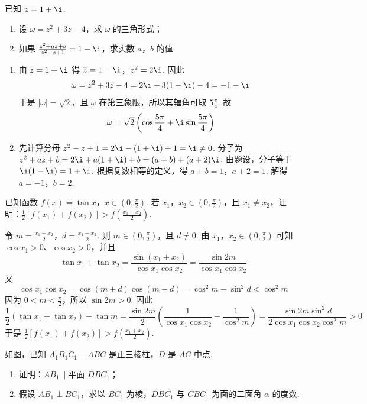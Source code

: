 \documentclass[UTF8,a4paper,oneside,11pt]{ctexbook}
\begin{document}
\begin{problem}
已知 \(z = 1 + \i\).

\begin{enumerate}
\item 设 \(\omega = z^2 + 3\overline{z} - 4\)，求 \(\omega\) 的三角形式；
\item 如果 \(\frac{z^{2}+az+b}{z^{2}-z+1}=1-\i\)，求实数 \(a\)，\(b\) 的值.
\end{enumerate}
\end{problem}

\begin{solution}
\begin{enumerate}
\item 由 \(z=1+\i\) 得 \(\overline{z}=1-\i\)，\(z^2=2\i\). 因此
\[
\omega=z^2+3\overline{z}-4
=2\i+3(1-\i)-4=-1-\i
\]
于是 \(|\omega|=\sqrt{2}\)，且 \(\omega\) 在第三象限，所以其辐角可取 \(5\frac{\pi}{4}\). 故
\[
\omega=\sqrt{2}\left(\cos\frac{5\pi}{4}+\i\sin\frac{5\pi}{4}\right)
\]
\item 先计算分母
\(z^2-z+1=2\i-(1+\i)+1=\i\neq0\).
分子为 \(z^2+az+b=2\i+a(1+\i)+b=(a+b)+(a+2)\i\). 由题设，分子等于 \(\i(1-\i)=1+\i\). 根据复数相等的定义，得 \(a+b=1\)，\(a+2=1\).
解得 \(a=-1\)，\(b=2\).
\end{enumerate}
\end{solution}

\begin{problem}
已知函数 \(f(x) = \tan x\)，\(x \in \left(0, \frac{\pi}{2}\right)\). 若 \(x_1\)，\(x_2 \in \left(0, \frac{\pi}{2}\right)\)，且 \(x_1 \neq x_2 \)，证明：\(\frac{1}{2}\left[f(x_1) + f(x_2)\right] > f\left(\frac{x_1 + x_2}{2}\right) \).
\end{problem}

\begin{solution}
令 \(m=\frac{x_1+x_2}{2}\)，\(d=\frac{x_1-x_2}{2}\).
则 \(m\in(0,\frac{\pi}{2})\)，且 \(d\neq0\). 由 \(x_1\)，\(x_2\in(0,\frac{\pi}{2})\) 可知 \(\cos x_1>0\)、\(\cos x_2>0\)，并且
\[
\tan x_1+\tan x_2
=\frac{\sin(x_1+x_2)}{\cos x_1\cos x_2}
=\frac{\sin 2m}{\cos x_1\cos x_2}
\]
又
\[
\cos x_1\cos x_2
=\cos(m+d)\cos(m-d)
=\cos^2m-\sin^2d<\cos^2m
\]
因为 \(0<m<\frac{\pi}{2}\)，所以 \(\sin2m>0\). 因此
\[
\frac12\left(\tan x_1+\tan x_2\right)-\tan m
=\frac{\sin2m}{2}\left(\frac{1}{\cos x_1\cos x_2}-\frac{1}{\cos^2m}\right)
=\frac{\sin2m\sin^2d}{2\cos x_1\cos x_2\cos^2m}>0
\]
于是 \(\frac12\left[f(x_1)+f(x_2)\right]>f\left(\frac{x_1+x_2}{2}\right)\).
\end{solution}

\begin{problem}
如图，已知 \(A_{1}B_{1}C_{1} - ABC\) 是正三棱柱，\(D\) 是 \(AC\) 中点.

\begin{enumerate}
\item 证明：\(AB_{1} \parallel \text{平面 } DBC_{1}\)；
\item 假设 \(AB_{1} \perp BC_{1}\)，求以 \(BC_{1}\) 为棱，\(DBC_{1}\) 与 \(CBC_{1}\) 为面的二面角 \(\alpha\) 的度数.
\end{enumerate}

\end{problem}
\end{document}
